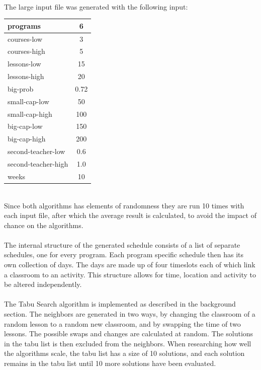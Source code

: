 \documentclass[titlepage,a4paper]{article}
\begin{document}
\medskip \\
The large input file was generated with the following input: \\
\medskip
\begin{tabular}{| l | c |}
  \hline
  programs & 6 \\
  \hline
  courses-low & 3 \\
  \hline
  courses-high & 5 \\
  \hline
  lessons-low & 15 \\
  \hline  
  lessons-high & 20 \\
  \hline  
  big-prob & 0.72 \\
  \hline  
  small-cap-low & 50 \\
  \hline  
  small-cap-high & 100 \\
  \hline  
  big-cap-low & 150 \\
  \hline  
  big-cap-high & 200 \\
  \hline  
  second-teacher-low & 0.6 \\
  \hline  
  second-teacher-high & 1.0 \\
  \hline
  weeks & 10 \\
  \hline
\end{tabular}
\medskip \\
Since both algorithms has elements of randomness they are run 10 times with each input file, after which the average result is calculated, to avoid the impact of chance on the algorithms. \\\\
The internal structure of the generated schedule consists of a list of separate schedules, one for every program. Each program specific schedule then has its own collection of days. The days are made up of four timeslots each of which link a classroom to an activity. This structure allows for time, location and activity to be altered independently. \\\\
The Tabu Search algorithm is implemented as described in the background section. The neighbors are generated in two ways, by changing the classroom of a random lesson to a random new classroom, and by swapping the time of two lessons. The possible swaps and changes are calculated at random. The solutions in the tabu list is then excluded from the neighbors. When researching how well the algorithms scale, the tabu list has a size of 10 solutions, and each solution remains in the tabu list until 10 more solutions have been evaluated. \\\\
\end{document}
